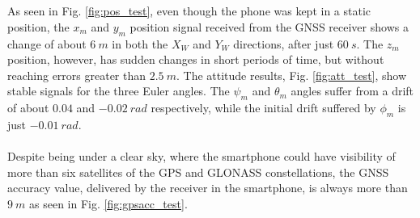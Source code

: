 \\\\As seen in Fig. \ref{fig:pos_test}, even though the phone was kept in a static position, the $x_m$ and $y_m$ position signal received from the GNSS receiver shows a change of about $6\ m$ in both the $X_W$ and $Y_W$ directions, after just $60\ s$. The $z_m$ position, however, has sudden changes in short periods of time, but without reaching errors greater than $2.5\ m$. The attitude results, Fig. \ref{fig:att_test}, show stable signals for the three Euler angles. The $\psi_m$ and $\theta_m$ angles suffer from a drift of about $0.04$ and $-0.02\ rad$ respectively, while the initial drift suffered by $\phi_m$ is just $-0.01\ rad$.
\\\\
Despite being under a clear sky, where the smartphone could have visibility of more than six satellites of the GPS and GLONASS constellations, the GNSS accuracy value, delivered by the receiver in the smartphone, is always more than $9\ m$ as seen in Fig. \ref{fig:gpsacc_test}. 
\\\\
